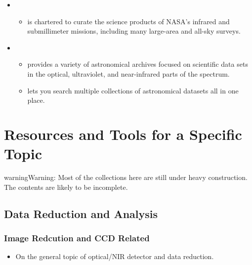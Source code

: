 \documentclass[letterpaper,10pt,english]{sphinxmanual}
\begin{document}
\begin{itemize}
\begin{itemize}
\end{itemize}

\item {} 
\begin{itemize}
\item {} 
 is chartered to curate the science products of NASA’s
infrared and submillimeter missions, including many large-area and
all-sky surveys.

\end{itemize}

\item {} 
\begin{itemize}
\item {} 
 provides a variety of astronomical archives focused on
scientific data sets in the optical, ultraviolet, and
near-infrared parts of the spectrum.

\item {} 
lets you search multiple collections of astronomical datasets all
in one place.

\end{itemize}

\end{itemize}


\section{Resources and Tools for a Specific Topic}
\label{\detokenize{astro_topic:resources-and-tools-for-a-specific-topic}}\label{\detokenize{astro_topic::doc}}
\begin{sphinxadmonition}{warning}{Warning:}
Most of the collections here are still under heavy construction. The contents are likely to be
incomplete.
\end{sphinxadmonition}


\subsection{Data Reduction and Analysis}
\label{\detokenize{astro_topic:data-reduction-and-analysis}}

\subsubsection{Image Redcution and CCD Related}
\label{\detokenize{resource/astro/topics/ccd_reduction:image-redcution-and-ccd-related}}\label{\detokenize{resource/astro/topics/ccd_reduction::doc}}\begin{itemize}
\item {} 
On the general topic of optical/NIR detector and data reduction.

\end{itemize}
\end{document}
